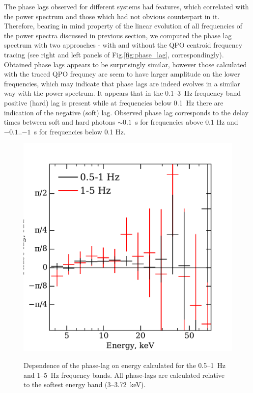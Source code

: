 \documentclass[a4paper,fleqn,usenatbib]{mnras}
\begin{document}
The phase lags observed for different systems had features, which correlated with the power spectrum and those which had not obvious counterpart in it. 
Therefore, bearing in mind property of the linear evolution of all frequencies of the power spectra discussed in previous section, we computed the phase lag spectrum with two approaches - with and without the QPO centroid frequency tracing (see right and left panels of Fig.\ref{fig:phase_lag}, correspondingly).
Obtained phase lags appears to be surprisingly similar, however those calculated with the traced QPO frequncy are seem to have larger amplitude on the lower frequencies, which may indicate that phase lags are indeed evolves in a similar way with the power spectrum. 
It appears that in the 0.1--3~Hz frequency band positive (hard) lag is present while at frequencies below 0.1~Hz there are indication of the negative (soft) lag.
Observed phase lag corresponds to the delay times between soft and hard photons $\sim0.1$~s for frequencies above 0.1 Hz and $-0.1$..$-1$~s for frequencies below 0.1 Hz.

\begin{figure}
    \includegraphics[width=\columnwidth]{phase_lag_en_dependence_2.pdf}
    \label{fig:phase_lag-energy}
    \caption{Dependence of the phase-lag on energy calculated for the 0.5--1~Hz and 1--5~Hz frequency bands. All phase-lags are calculated relative to the softest energy band (3--3.72~keV).}
\end{figure}
\end{document}
